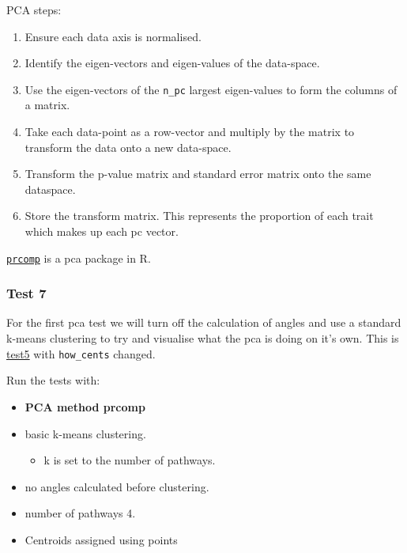 \documentclass[
]{article}
\providecommand{\tightlist}{%
  \setlength{\itemsep}{0pt}\setlength{\parskip}{0pt}}
\begin{document}
PCA steps:

\begin{enumerate}
\def\labelenumi{\arabic{enumi}.}
\tightlist
\item
  Ensure each data axis is normalised.
\item
  Identify the eigen-vectors and eigen-values of the data-space.
\item
  Use the eigen-vectors of the \texttt{n\_pc} largest eigen-values to
  form the columns of a matrix.
\item
  Take each data-point as a row-vector and multiply by the matrix to
  transform the data onto a new data-space.
\item
  Transform the p-value matrix and standard error matrix onto the same
  dataspace.
\item
  Store the transform matrix. This represents the proportion of each
  trait which makes up each pc vector.
\end{enumerate}

\href{https://www.rdocumentation.org/packages/stats/versions/3.6.2/topics/prcomp}{\texttt{prcomp}}
is a pca package in R.

\hypertarget{test7}{%
\subsubsection{Test 7}\label{test7}}

For the first pca test we will turn off the calculation of angles and
use a standard k-means clustering to try and visualise what the pca is
doing on it's own. This is \protect\hyperlink{test5}{test5} with
\texttt{how\_cents} changed.

Run the tests with:

\begin{itemize}
\tightlist
\item
  \textbf{PCA method prcomp}
\item
  basic k-means clustering.

  \begin{itemize}
  \tightlist
  \item
    k is set to the number of pathways.
  \end{itemize}
\item
  no angles calculated before clustering.
\item
  number of pathways 4.
\item
  Centroids assigned using points
\end{itemize}
\end{document}
